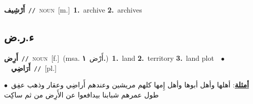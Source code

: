 \documentclass[10pt,a4paper,twoside]{article} %
\begin{document}
\begin{multicols}{2}
{\setlength\topsep{0pt}\textbf{\foreignlanguage{arabic}{أَرْشِيف}}\ {\color{gray}\texttt{//}\color{black}}\ \textsc{noun}\ [m.]\ \textbf{1.}~archive  \textbf{2.}~archives\ } \vspace{2mm}

\vspace{-3mm}
\subsection*{\color{blue}\foreignlanguage{arabic}{ء.ر.ض}\color{blue}{}} 

{\setlength\topsep{0pt}\textbf{\foreignlanguage{arabic}{أَرِض}}\ {\color{gray}\texttt{//}\color{black}}\ \textsc{noun}\ [f.]\ \color{gray}(msa. \foreignlanguage{arabic}{أَرْض}~\foreignlanguage{arabic}{\textbf{١.}})\color{black}\ \textbf{1.}~land  \textbf{2.}~territory  \textbf{3.}~land plot\ \ $\bullet$\ \ \setlength\topsep{0pt}\textbf{\foreignlanguage{arabic}{أَرَاضِي}}\ {\color{gray}\texttt{//}\color{black}}\ [pl.]\  \begin{flushright}\color{gray}\foreignlanguage{arabic}{\textbf{\underline{\foreignlanguage{arabic}{أمثلة}}}: أهلها وأهل أبوها وأهل إِمها كلهم مريشين وعندهم أَراضِي وعقار وذهب عفِق\ $\bullet$\ \  طول عمرهم شبابنا بيدافعوا عن الأَرِض من ثم ساكِت}\end{flushright}\color{black}} \vspace{2mm}


\end{multicols}
\end{document}
